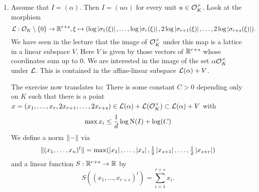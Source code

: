 \documentclass[a4paper,11pt]{article}
\begin{document}
\begin{enumerate}[wide, labelindent=0pt]
    \item Assume that $I = (\alpha)$.
        Then $I = (u \alpha)$ for every unit $u \in \mathcal{O}_K^\times$. Look at the morphism
        \begin{equation*}
            \mathcal{L}: \mathcal{O}_K\setminus \{0\} \to \mathbb{R}^{r+s}, 
            \xi \mapsto (\log \left\lvert \sigma_1(\xi) \right\rvert, \dots, \log \left\lvert \sigma_r(\xi) \right\rvert, 
            2\log \left\lvert \sigma_{r+1}(\xi) \right\rvert, \dots, 2 \log \left\lvert \sigma_{r+s}(\xi) \right\rvert).
        \end{equation*}
        We have seen in the lecture that the image of $\mathcal{O}_K^\times$ under this map 
        is a lattice in a linear subspace $V$. Here $V$ is given by those vectors
        of $\mathbb{R}^{r+s}$ whose coordinates sum up to $0$. We are interested
        in the image of the set $\alpha \mathcal{O}_K^\times$ under $\mathcal{L}$. This is contained
        in the affine-linear subspace $\mathcal{L}(\alpha) + V$. 
        
        The exercise now translates to: There is some constant $C > 0$ depending only
        on $K$ such that there is a point $x = (x_1, \dots, x_r, 2x_{r+1}, \dots,
        2x_{r+s}) \in \mathcal{L}(\alpha) + \mathcal{L}(\mathcal{O}_K^\times) \subset \mathcal{L}(\alpha)+V$ with 
        \begin{equation*}
             \max x_i \leq \frac 1d \log \operatorname{N}(I) + \log(C)
        \end{equation*}
        We define a norm $\lVert-\rVert$ via 
        \begin{equation*}
            \lVert(x_1, \dots, x_n)^t \rVert = \max (\left\lvert x_1 \right\rvert, \dots, \left\lvert x_s \right\rvert,
            \tfrac 12 \left\lvert x_{s+1} \right\rvert, \dots, \tfrac 12 \left\lvert x_{s+r} \right\rvert)
        \end{equation*}
        and a linear function $S: \mathbb{R}^{r+s} \to \mathbb{R}$
        by
        \begin{equation*}
            S((x_1,\dots, x_{r+s})^t) = \sum_{i=1}^{r+s} x_i.
        \end{equation*}


\end{enumerate}
\end{document}
